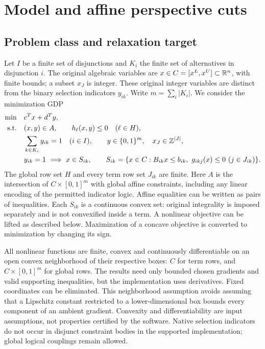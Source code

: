 \section{Model and affine perspective cuts}\label{sec:model}
\subsection{Problem class and relaxation target}
Let $I$ be a finite set of disjunctions and $K_i$ the finite set of alternatives in disjunction $i$. The original algebraic variables are $x\in C=[x^L,x^U]\subset\mathbb{R}^n$, with finite bounds; a subset $x_J$ is integer. These original integer variables are distinct from the binary selection indicators $y_{ik}$. Write $m=\sum_i|K_i|$. We consider the minimization GDP
\begin{subequations}\label{eq:gdp}
\begin{align}
 \min\quad &c^Tx+d^Ty,\\
 \text{s.t.}\quad &(x,y)\in A,\qquad h_\ell(x,y)\le0\quad(\ell\in H),\\
 &\sum_{k\in K_i}y_{ik}=1\quad(i\in I),\qquad y\in\{0,1\}^m,\quad x_J\in\mathbb{Z}^{|J|},\\
 &y_{ik}=1\ \Longrightarrow\ x\in S_{ik},\qquad
 S_{ik}=\{x\in C:B_{ik}x\le b_{ik},\ g_{ikj}(x)\le0\ (j\in J_{ik})\}.
\end{align}
\end{subequations}
The global row set $H$ and every term row set $J_{ik}$ are finite. Here $A$ is the intersection of $C\times[0,1]^m$ with global affine constraints, including any linear encoding of the permitted indicator logic. Affine equalities can be written as pairs of inequalities. Each $S_{ik}$ is a continuous convex set: original integrality is imposed separately and is not convexified inside a term. A nonlinear objective can be lifted as described below. Maximization of a concave objective is converted to minimization by changing its sign.

All nonlinear functions are finite, convex and continuously differentiable on an open convex neighborhood of their respective boxes: $C$ for term rows, and $C\times[0,1]^m$ for global rows. The results need only bounded chosen gradients and valid supporting inequalities, but the implementation uses derivatives. Fixed coordinates can be eliminated. This neighborhood assumption avoids assuming that a Lipschitz constant restricted to a lower-dimensional box bounds every component of an ambient gradient. Convexity and differentiability are input assumptions, not properties certified by the software. Native selection indicators do not occur in disjunct constraint bodies in the supported implementation; global logical couplings remain allowed.

